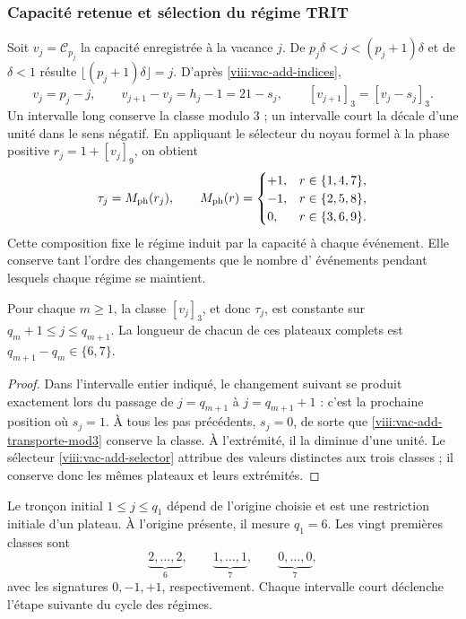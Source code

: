 \subsubsection{Capacité retenue et sélection du régime TRIT}
\label{viii:vac-add-regimen}

Soit \(v_j=\mathcal C_{p_j}\) la capacité enregistrée à la vacance
\(j\). De \(p_j\delta<j<(p_j+1)\delta\) et de \(\delta<1\) résulte
\(\lfloor(p_j+1)\delta\rfloor=j\). D'après
\eqref{viii:vac-add-indices},
\begin{equation}
 v_j=p_j-j,
 \qquad v_{j+1}-v_j=h_j-1=21-s_j,
 \qquad [v_{j+1}]_3=[v_j-s_j]_3.
 \label{viii:vac-add-transporte-mod3}
\end{equation}
Un intervalle long conserve la classe modulo \(3\) ; un intervalle court la décale d'une unité dans le sens négatif. En appliquant le sélecteur du noyau formel à la phase positive \(r_j=1+[v_j]_9\), on obtient
\begin{equation}
 \tau_j=M_{\rm ph}(r_j),\qquad
 M_{\rm ph}(r)=
 \begin{cases}
 +1,&r\in\{1,4,7\},\\
 -1,&r\in\{2,5,8\},\\
 0,&r\in\{3,6,9\}.
 \end{cases}
 \label{viii:vac-add-selector}
\end{equation}
Cette composition fixe le régime induit par la capacité à chaque
événement. Elle conserve tant l'ordre des changements que le nombre d'
événements pendant lesquels chaque régime se maintient.

\begin{corollary}
\label{viii:vac-add-mesetas}
Pour chaque \(m\geq1\), la classe \([v_j]_3\), et donc
\(\tau_j\), est constante sur
\(q_m+1\leq j\leq q_{m+1}\). La longueur de chacun de ces
plateaux complets est \(q_{m+1}-q_m\in\{6,7\}\).
\end{corollary}
\begin{proof}
Dans l'intervalle entier indiqué, le changement suivant se produit exactement lors du passage de \(j=q_{m+1}\) à \(j=q_{m+1}+1\) : c'est la prochaine position où \(s_j=1\). À tous les pas précédents, \(s_j=0\), de sorte que \eqref{viii:vac-add-transporte-mod3} conserve la classe. À l'extrémité, il la diminue d'une unité. Le sélecteur \eqref{viii:vac-add-selector} attribue des valeurs distinctes aux trois classes ; il conserve donc les mêmes plateaux et leurs extrémités.
\end{proof}

Le tronçon initial \(1\leq j\leq q_1\) dépend de l'origine choisie et
est une restriction initiale d'un plateau. À l'origine présente, il mesure
\(q_1=6\). Les vingt premières classes sont
\[
 \underbrace{2,\ldots,2}_{6},\qquad
 \underbrace{1,\ldots,1}_{7},\qquad
 \underbrace{0,\ldots,0}_{7},
\]
avec les signatures \(0,-1,+1\), respectivement. Chaque intervalle court
déclenche l'étape suivante du cycle des régimes.

